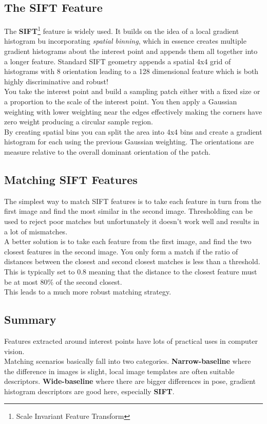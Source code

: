 \documentclass{article}
\begin{document}
	\subsection{The SIFT Feature}
	The \textbf{SIFT}\footnote{Scale Invariant Feature Transform} feature is widely used. It builds on the idea of a local gradient histogram bu incorporating \textit{spatial binning}, which in essence creates multiple gradient histograms about the interest point and appends them all together into a longer feature. Standard SIFT geometry appends a spatial 4x4 grid of histograms with 8 orientation leading to a 128 dimensional feature which is both highly discriminative and robust!\\
	You take the interest point and build a sampling patch either with a fixed size or a proportion to the scale of the interest point. You then apply a Gaussian weighting with lower weighting near the edges effectively making the corners have zero weight producing a circular sample region.\\
	By creating spatial bins you can split the area into 4x4 bins and create a gradient histogram for each using the previous Gaussian weighting. The orientations are measure relative to the overall dominant orientation of the patch.
	\subsection{Matching SIFT Features}
	The simplest way to match SIFT features is to take each feature in turn from the first image and find the most similar in the second image. Thresholding can be used to reject poor matches but unfortunately it doesn't work well and results in a lot of mismatches. \\
	A better solution is to take each feature from the first image, and find the two closest features in the second image. You only form a match if the ratio of distances between the closest and second closest matches is less than a threshold. This is typically set to 0.8 meaning that the distance to the closest feature must be at most 80\% of the second closest.\\
	This leads to a much more robust matching strategy.
	\subsection{Summary}
	Features extracted around interest points have lots of practical uses in computer vision.\\
	Matching scenarios basically fall into two categories. \textbf{Narrow-baseline} where the difference in images is slight, local image templates are often suitable descriptors. \textbf{Wide-baseline} where there are bigger differences in pose, gradient histogram descriptors are good here, especially \textbf{SIFT}.
	
\end{document}

